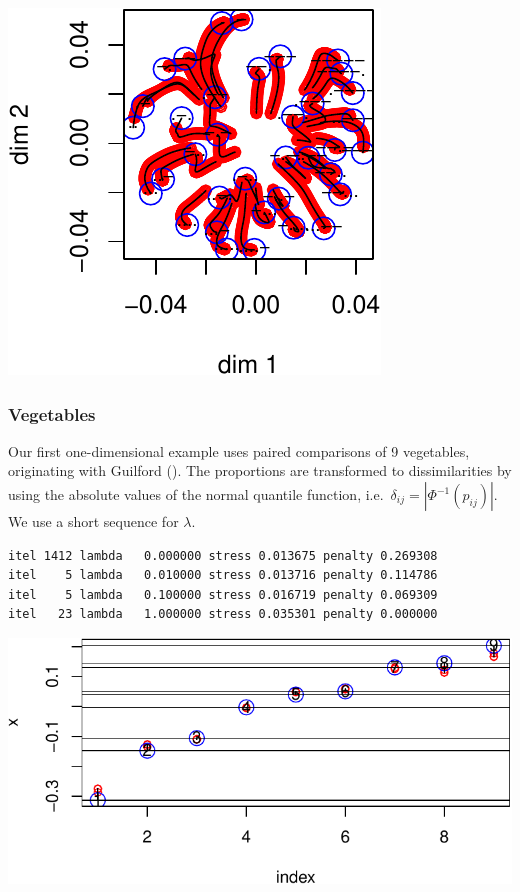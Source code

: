 \documentclass[
  12pt,
  letterpaper,
  DIV=11,
  numbers=noendperiod]{scrreprt}
\theoremstyle{remark}
\begin{document}
\begin{center}
\includegraphics{global_files/figure-pdf/morse-1.pdf}
\end{center}

\subsubsection{Vegetables}\label{vegetables}

Our first one-dimensional example uses paired comparisons of 9
vegetables, originating with Guilford
(). The proportions are transformed to
dissimilarities by using the absolute values of the normal quantile
function, i.e.~\(\delta_{ij}=|\Phi^{-1}(p_{ij})|\). We use a short
sequence for \(\lambda\).

\begin{verbatim}
itel 1412 lambda   0.000000 stress 0.013675 penalty 0.269308 
itel    5 lambda   0.010000 stress 0.013716 penalty 0.114786 
itel    5 lambda   0.100000 stress 0.016719 penalty 0.069309 
itel   23 lambda   1.000000 stress 0.035301 penalty 0.000000 
\end{verbatim}

\begin{center}
\includegraphics{global_files/figure-pdf/veg-1.pdf}
\end{center}
\end{document}
